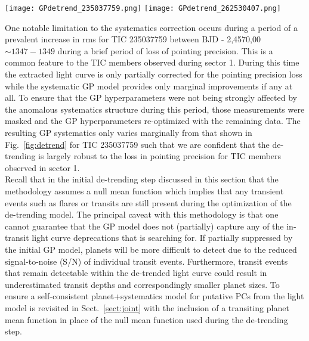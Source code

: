 \begin{figure*}
  \centering
  \texttt{[image: GPdetrend\_235037759.png]}
  \texttt{[image: GPdetrend\_262530407.png]}
  \caption{Two demonstrations of the \pipeline{} initial de-trending stage for TIC 235037759 and TIC 262530407.
    \emph{Large panels}: the 2 minute raw and binned \tess{} light curves with temporal
    binning chosen to sample eight GP periodic timescales (40.1 and 78.9 minute bins for TIC 235037759
    and 262530407 respectively). Solid red curves and their surrounding shaded regions
    depict the mean GP model used for de-trending and its $1\sigma$ confidence intervals which are often
    small and difficult to visualize everywhere except during the data transfer gap at the centers of each
    light curve. Vertical ticks along the abscissa axes are indicative of the transit times of planet
    candidates flagged by \pipeline{} at
    6.2 and 2.9 days around TIC 235037759 and TIC 262530407 respectively.
    \emph{Shallow panels}: the raw and binned light curves after de-trending.}
  \label{fig:detrend}
\end{figure*}

One notable limitation to the systematics correction occurs during a period of a prevalent increase
in rms for TIC 235037759 between BJD - 2,4570,00 $\sim 1347-1349$ during a brief period of loss of
\tess{} pointing precision.  This is a common feature to
the TIC members observed during \tess{} sector 1. During this time the extracted light curve is only
partially corrected for the pointing precision loss while the systematic GP model provides only marginal
improvements if any at all.
To ensure that the GP hyperparameters were not being strongly affected by the anomalous systematics structure
during this period, those measurements were masked and the GP hyperparameters re-optimized with the
remaining data. The resulting GP systematics only varies marginally from that shown in
Fig.~\ref{fig:detrend} for TIC 235037759 such that we are confident that the \pipeline{} de-trending is
largely robust to the loss in pointing precision for TIC members observed in \tess{} sector 1. \\

Recall that in the initial de-trending step discussed in this section that the methodology
assumes a null mean function which implies that any transient events such as flares or transits are still
present during the optimization of the de-trending model.
The principal caveat with this methodology is that one cannot guarantee
that the GP model does not (partially) capture any of the in-transit light curve deprecations that
\pipeline{} is searching for. If partially suppressed by the initial GP model, planets will be more
difficult to detect due to the reduced signal-to-noise (S/N) of individual transit events.
Furthermore, transit events
that remain detectable within the de-trended light curve could result in underestimated transit depths
and correspondingly smaller planet sizes. To ensure a self-consistent planet+systematics model
for putative PCs from \pipeline{,} the light model is revisited in Sect.~\ref{sect:joint}
with the inclusion of a transiting planet mean function in place of the null mean function used during
the de-trending step.

